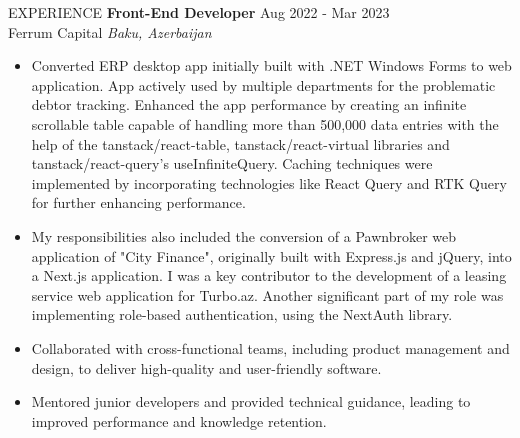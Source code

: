 \documentclass{resume} %
\begin{document}
\begin{rSection}{EXPERIENCE}
\textbf{Front-End Developer} \hfill Aug 2022 - Mar 2023\\
Ferrum Capital \hfill \textit{Baku, Azerbaijan}
 \begin{itemize}
    \itemsep -3pt {}
    \item 
    Converted ERP desktop app initially built with .NET Windows Forms to web application. App actively used by multiple departments for the problematic debtor tracking. Enhanced the app performance by creating an infinite scrollable table capable of handling more than 500,000 data entries with the help of the tanstack/react-table, tanstack/react-virtual libraries and tanstack/react-query's useInfiniteQuery. Caching techniques were implemented by incorporating technologies like React Query and RTK Query for further enhancing performance.
    \item 
    My responsibilities also included the conversion of a Pawnbroker web application of "City Finance", originally built with Express.js and jQuery, into a Next.js application. I was a key contributor to the development of a leasing service web application for Turbo.az. Another significant part of my role was implementing role-based authentication, using the NextAuth library.
     \item Collaborated with cross-functional teams, including product management and design, to deliver high-quality and user-friendly software.
     \item Mentored junior developers and provided technical guidance, leading to improved performance and knowledge retention.
 \end{itemize}
\end{rSection} 

\end{document}
